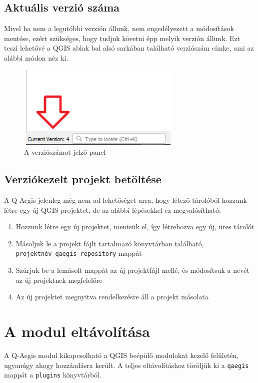 \subsection{Aktuális verzió száma}
Mivel ha nem a legutóbbi verzión állunk, nem engedélyezett a módosítások mentése, ezért szükséges, hogy tudjuk követni épp melyik verzión állunk. Ezt teszi lehetővé a QGIS ablak bal alsó sarkában található verziószám címke, ami az alábbi módon néz ki.
\begin{figure}[H]
	\centering
	\includegraphics[width=0.7\textwidth,height=150px]{images/version_display.png}
	\caption{A verziószámot jelző panel}
	\label{fig:picture-6}
\end{figure}


\subsection{Verziókezelt projekt betöltése}
A Q-Aegis jelenleg még nem ad lehetőséget arra, hogy létező tárolóból hozzunk létre egy új QGIS projektet, de az alábbi lépésekkel ez megvalósítható:
\begin{enumerate}
	\item Hozzunk létre egy új projektet, mentsük el, így létrehozva egy új, üres tárolót
	\item Másoljuk le a projekt fájlt tartalmazó könyvtárban található, \texttt{projektnév\_qaegis\_repository} mappát
	\item Szúrjuk be a lemásolt mappát az új projektfájl mellé, és módosítsuk a nevét az új projektnek megfelelőre
	\item Az új projektet megnyitva rendelkezésre áll a projekt másolata
\end{enumerate}
	
\section{A modul eltávolítása}
A Q-Aegis modul kikapcsolható a QGIS beépülő modulokat kezelő felületén, ugyanúgy ahogy hozzáadásra került. A teljes eltávolításhoz töröljük ki a \texttt{qaegis} mappát a \texttt{plugins} könyvtárból.
	
